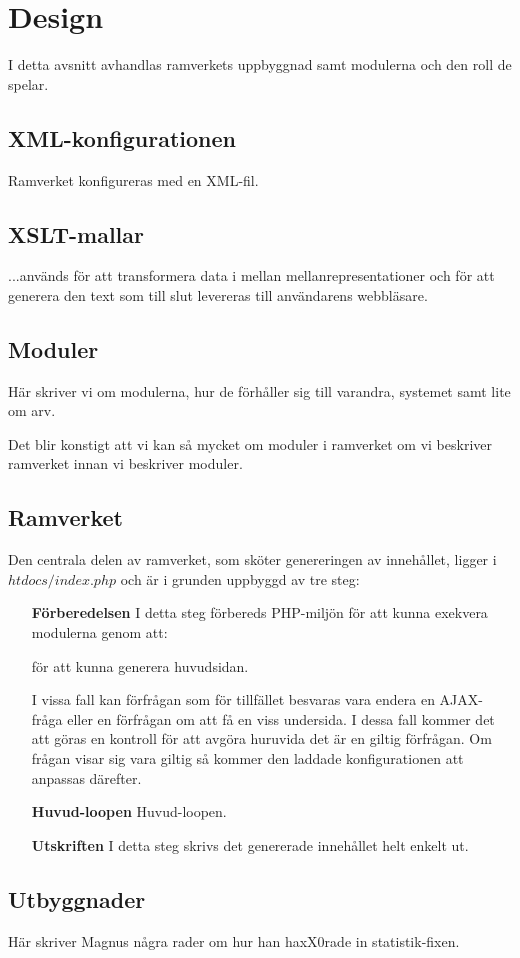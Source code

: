 \section{Design}
I detta avsnitt avhandlas ramverkets uppbyggnad samt modulerna och den roll de
spelar.

\subsection{XML-konfigurationen}
Ramverket konfigureras med en XML-fil.

\subsection{XSLT-mallar}
...används för att transformera data i mellan mellanrepresentationer och för att
generera den text som till slut levereras till användarens webbläsare.

\subsection{Moduler}
Här skriver vi om modulerna, hur de förhåller sig till varandra, systemet samt
lite om arv.

Det blir konstigt att vi kan så mycket om moduler i ramverket om vi
beskriver ramverket innan vi beskriver moduler.

\subsection{Ramverket}
Den centrala delen av ramverket, som sköter genereringen av innehållet, ligger
i $htdocs/index.php$ och är i grunden uppbyggd av tre steg:

\begin{itemize}
  \item[\bf Förberedelsen]
    I detta steg förbereds PHP-miljön för att kunna exekvera modulerna genom
    att:
    för att kunna generera huvudsidan.

    I vissa fall kan förfrågan som för tillfället besvaras vara endera en
    AJAX-fråga eller en förfrågan om att få en viss undersida. I dessa fall
    kommer det att göras en kontroll för att avgöra huruvida det är en giltig
    förfrågan. Om frågan visar sig vara giltig så kommer den laddade
    konfigurationen att anpassas därefter.
  \item[\bf Huvud-loopen]
    Huvud-loopen.

  \item[\bf Utskriften]
    I detta steg skrivs det genererade innehållet helt enkelt ut.
\end{itemize}

\subsection{Utbyggnader}
Här skriver Magnus några rader om hur han haxX0rade in statistik-fixen.
